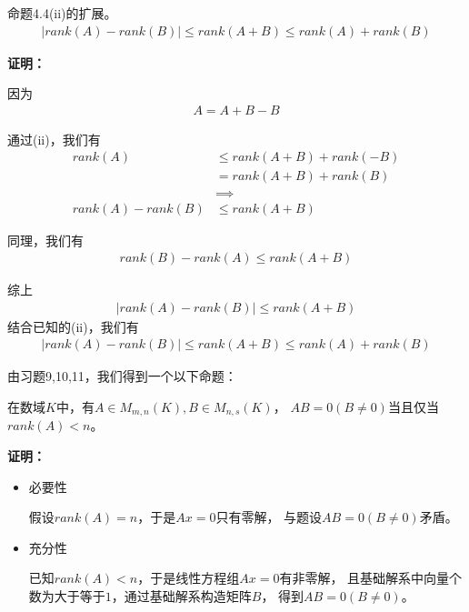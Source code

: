 \documentclass{article}
\begin{document}
\begin{zremark}
  命题4.4(ii)的扩展。
  \begin{align*}
    |rank(A) - rank(B)| \leq rank(A + B) \leq rank(A) + rank(B)
  \end{align*}
\end{zremark}

\textbf{证明：}

因为
\begin{align*}
  A = A + B - B
\end{align*}

通过(ii)，我们有
\begin{align*}
  rank(A)           & \leq rank(A + B) + rank(-B) \\
                    & = rank(A + B) + rank(B)     \\
                    & \implies                    \\
  rank(A) - rank(B) & \leq rank(A + B)
\end{align*}

同理，我们有
\begin{align*}
  rank(B) - rank(A) \leq rank(A + B)
\end{align*}

综上
\begin{align*}
  |rank(A) - rank(B)| \leq rank(A + B)
\end{align*}
结合已知的(ii)，我们有
\begin{align*}
  |rank(A) - rank(B)| \leq rank(A + B) \leq rank(A) + rank(B)
\end{align*}

\begin{zremark}
  由习题9,10,11，我们得到一个以下命题：

  在数域$K$中，有$A \in M_{m,n}(K), B \in M_{n,s}(K)$，
  $AB = 0 (B \neq 0)$当且仅当$rank(A) < n$。
\end{zremark}

\textbf{证明：}

\begin{itemize}
  \item 必要性

        假设$rank(A) = n$，于是$A x = 0$只有零解，
        与题设$A B = 0 (B \neq 0)$矛盾。

  \item 充分性

    已知$rank(A) < n$，于是线性方程组$Ax = 0$有非零解，
    且基础解系中向量个数为大于等于$1$，通过基础解系构造矩阵$B$，
    得到$AB = 0 (B \neq 0)$。
\end{itemize}
\end{document}
